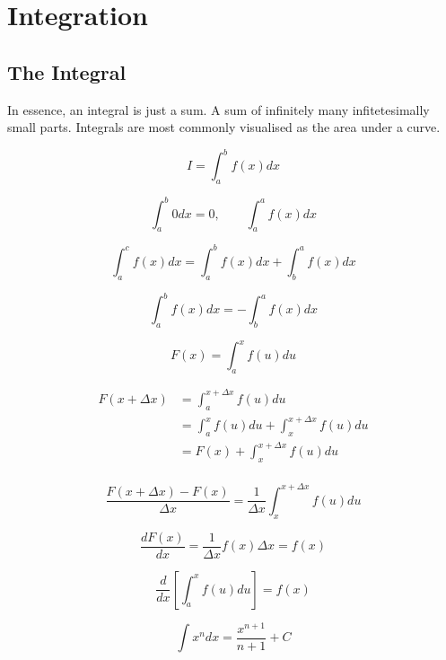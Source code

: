 \chapter{Integration}
\section{The Integral}

In essence, an integral is just a sum. A sum of infinitely many infitetesimally small parts.
Integrals are most commonly visualised as the area under a curve.

\begin{equation*}
    I = \int_{a}^{b} f(x)dx
\end{equation*}

\[\int_{a}^{b}0dx = 0, \qquad \int_{a}^{a}f(x)dx\]

\begin{equation*}
    \int_{a}^{c}f(x)dx = \int_{a}^{b}f(x)dx + \int_{b}^{a}f(x)dx
\end{equation*}

\begin{equation*}
    \int_{a}^{b}f(x)dx = - \int_{b}^{a}f(x)dx
\end{equation*}

\begin{equation*}
    F(x) = \int_{a}^{x}f(u)du
\end{equation*}

\begin{align*}
    F(x + \Delta x) &= \int_{a}^{x + \Delta x}f(u)du\\
    &= \int_{a}^{x}f(u)du + \int_{x}^{x + \Delta x}f(u)du\\
    &= F(x) + \int_{x}^{x + \Delta x}f(u)du\\
\end{align*}

\begin{equation*}
    \frac{F(x + \Delta x) - F(x)}{\Delta x} = 
    \frac{1}{\Delta x}\int_{x}^{x + \Delta x}f(u)du
\end{equation*}

\begin{equation*}
    \frac{dF(x)}{dx} = \frac{1}{\Delta x}f(x)\Delta x = f(x)
\end{equation*}

\begin{equation*}
    \frac{d}{dx}\left[\int_{a}^{x}f(u)du\right] = f(x)
\end{equation*}

\begin{equation*}
    \int x^{n}dx = \frac{x^{n+1}}{n+1} + C
\end{equation*}

